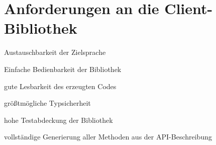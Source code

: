 
\section{Anforderungen an die Client-Bibliothek}
\label{item:requirements}

\begin{compactitem}
    \item Austauschbarkeit der Zielsprache
    \item Einfache Bedienbarkeit der Bibliothek
    \item gute Lesbarkeit des erzeugten Codes
    \item größtmögliche Typsicherheit
    \item hohe Testabdeckung der Bibliothek
    \item vollständige Generierung aller Methoden aus der \gls{API}-Beschreibung
\end{compactitem}